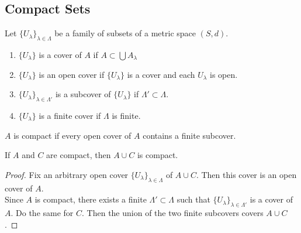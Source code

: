 \documentclass[11pt]{article}
\begin{document}
\subsection{Compact Sets}
\begin{definition}[7.4]
    Let $\{U_\lambda\}_{\lambda \in \Lambda}$ be a family of subsets of a metric space $(S,d)$.
    \begin{enumerate}
        \item$\{U_\lambda\}$ is a cover of $A$ if $A \subset \bigcup A_\lambda$ 
        \item $\{U_\lambda\}$ is an open cover if $\{U_\lambda\}$ is a cover and each $U_\lambda$ is open.
        \item $\{U_\lambda\}_{\lambda \in \Lambda'}$ is a subcover of $\{U_\lambda\}$ if $\Lambda' \subset \Lambda$.
        \item  $\{U_\lambda\}$ is a finite cover if $\Lambda$ is finite.
    \end{enumerate}
    
\end{definition}
\begin{definition}[7.5]
    $A$ is compact if every open cover of $A$ contains a finite subcover.
\end{definition}

\begin{example}[7.1]
    If $A$ and $C$ are compact, then $A \cup C$ is compact.
\end{example}
\begin{proof}
    Fix an arbitrary open cover $\{U_\lambda\}_{\lambda \in \Lambda}$ of $A \cup C$. Then this cover is an open cover of $A$.\\
    Since $A$ is compact, there exists a finite $\Lambda' \subset \Lambda$ such that $\{U_\lambda\}_{\lambda \in \Lambda'}$ is a cover of $A$.
    Do the same for $C$. Then the union of the two finite subcovers covers $A \cup C$.
\end{proof}
\end{document}
